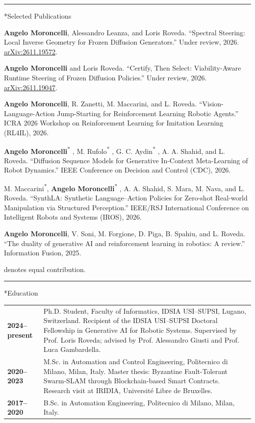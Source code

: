 \documentclass[10pt,a4paper]{article}
\makeatletter
\renewcommand{\section}{\@ifstar\cvsection\cvsection}
\newcommand{\cvsection}[1]{\par\addvspace{9pt}{\large\bfseries #1\par}\nobreak\vspace{4pt}\hrule\nobreak\vspace{5pt}}
\makeatother
\begin{document}
\section*{Selected Publications}
\begin{enumerate}[label={[\arabic*]},leftmargin=1.5em,itemsep=4pt,topsep=3pt]
\item \textbf{Angelo Moroncelli}, Alessandro Leanza, and Loris Roveda. “Spectral Steering: Local Inverse Geometry for Frozen Diffusion Generators.” Under review, 2026. \href{https://arxiv.org/abs/2611.19572}{arXiv:2611.19572}.
\item \textbf{Angelo Moroncelli} and Loris Roveda. “Certify, Then Select: Viability-Aware Runtime Steering of Frozen Diffusion Policies.” Under review, 2026. \href{https://arxiv.org/abs/2611.19047}{arXiv:2611.19047}.
\item \textbf{Angelo Moroncelli}, R. Zanetti, M. Maccarini, and L. Roveda. “Vision-Language-Action Jump-Starting for Reinforcement Learning Robotic Agents.” ICRA 2026 Workshop on Reinforcement Learning for Imitation Learning (RL4IL), 2026.
\item \textbf{Angelo Moroncelli}\textsuperscript{*} , M. Rufolo\textsuperscript{*} , G. C. Aydin\textsuperscript{*} , A. A. Shahid, and L. Roveda. “Diffusion Sequence Models for Generative In-Context Meta-Learning of Robot Dynamics.” IEEE Conference on Decision and Control (CDC), 2026.
\item M. Maccarini\textsuperscript{*}, \textbf{Angelo Moroncelli}\textsuperscript{*} , A. A. Shahid, S. Mara, M. Nava, and L. Roveda. “SynthLA: Synthetic Language–Action Policies for Zero-shot Real-world Manipulation via Structured Perception.” IEEE/RSJ International Conference on Intelligent Robots and Systems (IROS), 2026.
\item \textbf{Angelo Moroncelli}, V. Soni, M. Forgione, D. Piga, B. Spahiu, and L. Roveda. “The duality of generative AI and reinforcement learning in robotics: A review.” Information Fusion, 2025.
\end{enumerate}
{\footnotesize * denotes equal contribution.}

\section*{Education}
\begin{tabularx}{\textwidth}{@{}p{}@{\hspace{8pt}}X@{}}
\textbf{2024–present} & Ph.D. Student, Faculty of Informatics, IDSIA USI–SUPSI, Lugano, Switzerland. Recipient of the IDSIA USI–SUPSI Doctoral Fellowship in Generative AI for Robotic Systems. Supervised by Prof. Loris Roveda; advised by Prof. Alessandro Giusti and Prof. Luca Gambardella.\\[4pt]
\textbf{2020–2023} & M.Sc. in Automation and Control Engineering, Politecnico di Milano, Milan, Italy. Master thesis: Byzantine Fault-Tolerant Swarm-SLAM through Blockchain-based Smart Contracts. Research visit at IRIDIA, Université Libre de Bruxelles.\\[4pt]
\textbf{2017–2020} & B.Sc. in Automation Engineering, Politecnico di Milano, Milan, Italy.
\end{tabularx}
\end{document}
